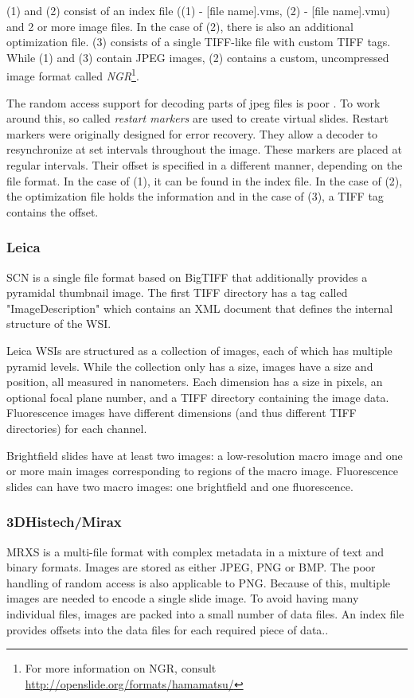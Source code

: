 (1) and (2) consist of an index file ((1) - [file name].vms, (2) - [file name].vmu) and 2 or more image files. In the case of (2), there is also an additional optimization file. (3) consists of a single TIFF-like file with custom TIFF tags. While (1) and (3) contain JPEG images, (2) contains a custom, uncompressed image format called \emph{NGR}\footnote{For more information on NGR, consult \url{http://openslide.org/formats/hamamatsu/}}\cite{web:openslide}.

The random access support for decoding parts of jpeg files is poor \cite{web:openslide}. To work around this, so called \emph{restart markers} are used to create virtual slides. Restart markers were originally designed for error recovery. They allow a decoder to resynchronize at set intervals throughout the image\cite{Goode13}.	
These markers are placed at regular intervals. Their offset is specified in a different manner, depending on the file format. In the case of (1), it can be found in the index file. In the case of (2), the optimization file holds the information and in the case of (3), a TIFF tag contains the offset\cite{web:openslide}.


\subsubsection{Leica}
SCN is a single file format based on BigTIFF that additionally provides a pyramidal thumbnail image\cite{Goode13}. The first TIFF directory has a tag called "ImageDescription" which contains an XML document that defines the internal structure of the WSI\cite{web:openslide}.

Leica WSIs are structured as a collection of images, each of which has multiple pyramid levels. While the collection only has a size, images have a size and position, all measured in nanometers. Each dimension has a size in pixels, an optional focal plane number, and a TIFF directory containing the image data. Fluorescence images have different dimensions (and thus different TIFF directories) for each channel\cite{web:openslide}.

Brightfield slides have at least two images: a low-resolution macro image and one or more main images corresponding to regions of the macro image. Fluorescence slides can have two macro images: one brightfield and one fluorescence\cite{web:openslide}.


\subsubsection{3DHistech/Mirax}
MRXS is a multi-file format with complex metadata in a mixture of text and binary formats. Images are stored as either JPEG, PNG or BMP\cite{Goode13}. The poor handling of random access is also applicable to PNG. Because of this, multiple images are needed to encode a single slide image. To avoid having many individual files, images are packed into a small number of data files. An index file provides offsets into the data files for each required piece of data.\cite{web:openslide}. 

